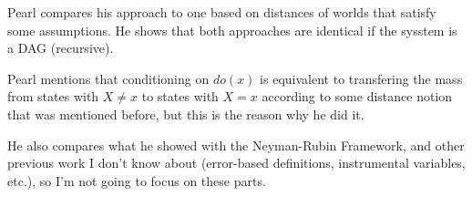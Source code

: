 Pearl compares his approach to one based on distances of worlds that satisfy some assumptions. He shows that both approaches are identical if the sysstem is a DAG (recursive).

Pearl mentions that conditioning on $do(x)$ is equivalent to transfering the mass from states with $X\neq x$ to states with $X=x$ according to some distance notion that was mentioned before, but this is the reason why he did it.

He also compares what he showed with the Neyman-Rubin Framework, and other previous work I don't know about (error-based definitions, instrumental variables, etc.), so I'm not going to focus on these parts.


